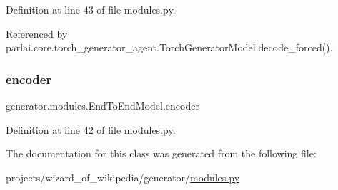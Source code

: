 Definition at line 43 of file modules.\+py.



Referenced by parlai.\+core.\+torch\+\_\+generator\+\_\+agent.\+Torch\+Generator\+Model.\+decode\+\_\+forced().

\mbox{\label{classgenerator_1_1modules_1_1EndToEndModel_a2cff6b20a68bbe5822ced5d16177ac31}} 
\subsubsection{\texorpdfstring{encoder}{encoder}}
{\footnotesize\ttfamily generator.\+modules.\+End\+To\+End\+Model.\+encoder}



Definition at line 42 of file modules.\+py.



The documentation for this class was generated from the following file\+:\begin{DoxyCompactItemize}
\item 
projects/wizard\+\_\+of\+\_\+wikipedia/generator/\hyperlink{projects_2wizard__of__wikipedia_2generator_2modules_8py}{modules.\+py}\end{DoxyCompactItemize}
